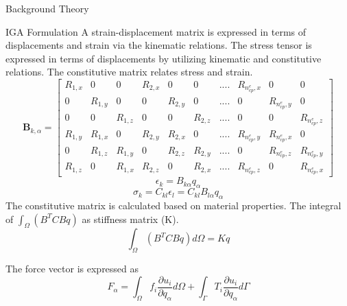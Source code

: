 \documentclass[a4paper,12pt,times]{article}
\begin{document}
\begin{section}{Background Theory}
\begin{subsection}{IGA Formulation}
A strain-displacement matrix is expressed in terms of displacements
and strain via the kinematic relations.
The stress tensor is expressed in terms of displacements by utilizing
kinematic and constitutive relations. The constitutive matrix relates stress and strain.
\begin{equation} \label{BMatrix}
\textbf{B}_{k,\alpha} =
\begin{bmatrix}
R_{1,x} & 0 & 0 & R_{2,x} & 0 & 0 & .... & R_{n_{cp}^e,x} & 0 & 0 \\
0 &R_{1,y} & 0 & 0 & R_{2,y} & 0 & .... & 0 & R_{n_{cp}^e,y} & 0  \\
0 & 0 & R_{1,z} &0 & 0 & R_{2,z} & .... &0 & 0 & R_{n_{cp}^e,z}  \\
R_{1,y} & R_{1,x} & 0 & R_{2,y} & R_{2,x} & 0 & .... & R_{n_{cp}^e,y} &
R_{n_{cp}^e,x} & 0 \\
0 & R_{1,z} & R_{1,y} & 0 & R_{2,z} & R_{2,y} & .... & 0 & R_{n_{cp}^e,z} &
R_{n_{cp}^e,y}\\
R_{1,z} &0 & R_{1,x} & R_{2,z} &0 & R_{2,x} & .... &R_{n_{cp}^e,z} &0
&R_{n_{cp}^e,x}
\end{bmatrix}
\end{equation}
\begin{equation}
\epsilon_{k}=B_{k \alpha} q_{\alpha}
\end{equation}
\begin{equation}
\sigma_{k}=C_{k l} \epsilon_{l}=C_{k l} B_{l \alpha} q_{\alpha}
\end{equation}
The constitutive matrix is calculated based on material properties.
The integral of $\int_{\Omega}\left(B^{T} C B q\right)$ as stiffness matrix (K).
\begin{equation}\label{stiffness matrix}
\int_{\Omega}\left(B^{T} C B q\right) d \Omega=K q
\end{equation}

The force vector is expressed as 
\begin{equation}\label{force vector}
F_{\alpha}=\int_{\Omega} f_{i} \frac{\partial u_{i}}{\partial q_{\alpha}} d \Omega+\int_{\Gamma} T_{i} \frac{\partial u_{i}}{\partial q_{\alpha}} d \Gamma
\end{equation}


\end{subsection}



\end{section}
\end{document}
